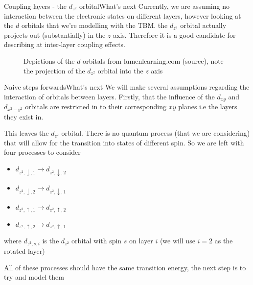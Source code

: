 \documentclass[9pt]{beamer}
\begin{document}
\begin{frame}{Coupling layers - the $d_{z^2}$ orbital}{What's next}
  Currently, we are assuming no interaction between the electronic states on different layers, however looking at the $d$ orbitals that we're modelling with the TBM. the $d_{z^2}$ orbital actually projects out (substantially) in the $z$ axis. Therefore it is a good candidate for describing at inter-layer coupling effects.

  \begin{figure}
    \centering
    \caption{Depictions of the $d$ orbitals from lumenlearning.com (source), note the projection of the $d_{z^2}$ orbital into the $z$ axis}
  \end{figure}
\end{frame}

\begin{frame}{Naive steps forwards}{What's next}
  We will make several assumptions regarding the interaction of orbitals between layers. Firstly, that the influence of the $d_{xy}$ and $d_{x^2-y^2}$ orbitals are restricted in to their corresponding $xy$ planes i.e the layers they exist in.

  This leaves the $d_{z^2}$ orbital. There is no quantum process (that we are considering) that will allow for the transition into states of different spin. So we are left with four processes to consider

  \begin{itemize}
    \item $d_{z^2, \downarrow, 1} \rightarrow d_{z^2, \downarrow, 2}$
    \item $d_{z^2, \downarrow, 2} \rightarrow d_{z^2, \downarrow, 1}$
    \item $d_{z^2, \uparrow, 1} \rightarrow d_{z^2, \uparrow, 2}$
    \item $d_{z^2, \uparrow, 2} \rightarrow d_{z^2, \uparrow, 1}$
  \end{itemize}

  where $d_{z^2, s, i}$ is the $d_{z^2}$ orbital with spin $s$ on layer $i$ (we will use $i=2$ as the rotated layer)

  All of these processes should have the same transition energy, the next step is to try and model them
\end{frame}
\end{document}
